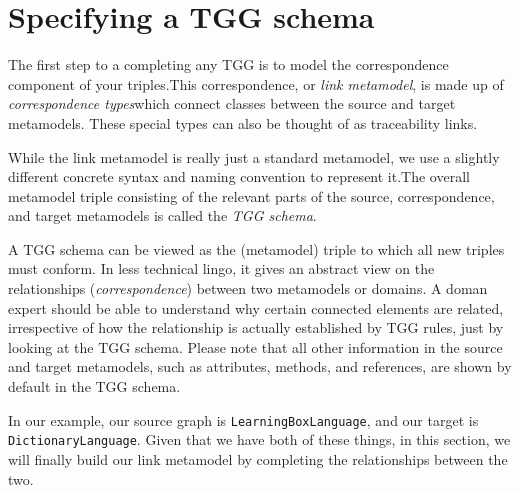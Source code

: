 \newpage
\hypertarget{TGGSchema}{}
\section{Specifying a TGG schema}
\genHeader

The first step to a completing any TGG is to model the correspondence component of your triples.This correspondence, or \emph{link
metamodel}, is made up of \emph{correspondence types}which connect classes between the source and target metamodels. These special
types can also be thought of as traceability links.

While the link metamodel is really just a standard metamodel, we use a slightly different concrete syntax and naming convention to represent it.The overall metamodel triple consisting of the relevant parts of the source, correspondence, and target metamodels is called the \emph{TGG schema}.

A TGG schema can be viewed as the (metamodel) triple to which all new triples must conform. In less technical lingo, it gives an abstract view on the
relationships (\emph{correspondence}) between two metamodels or domains. A doman expert should be able to understand why certain connected elements are related,
irrespective of how the relationship is actually established by TGG rules, just by looking at the TGG schema. Please note that all other information in the
source and target metamodels, such as attributes, methods, and references, are shown by default in the TGG schema.

In our example, our source graph is \texttt{LearningBoxLanguage}, and our target is \texttt{DictionaryLanguage}. Given that we have both of these things, in
this section, we will finally build our link metamodel by completing the relationships between the two.





